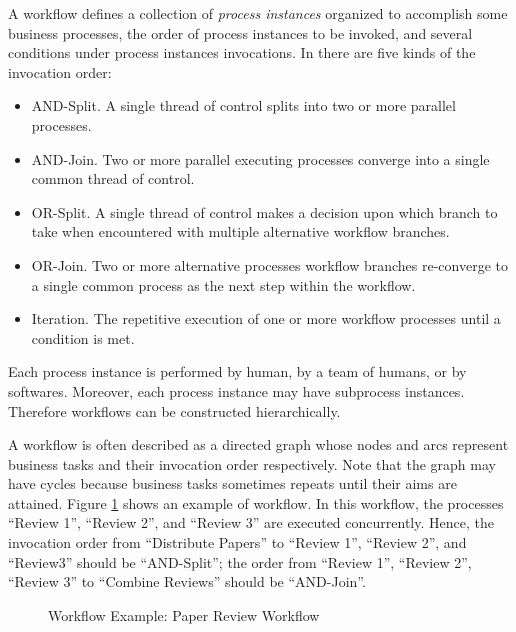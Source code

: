 A workflow defines a collection of \emph{process instances} organized to
accomplish some business processes, the order of process instances to be
invoked, and several conditions under process instances invocations.
In \cite{96:wfCoalitionTC1011} there are five kinds of the invocation
order:
\begin{itemize}
 \setlength{\itemsep}{0mm}
 \setlength{\parskip}{0mm}
 \item AND-Split.  A single thread of control splits into two or more
       parallel processes.
 \item AND-Join.  Two or more parallel executing processes converge into
       a single common thread of control.
 \item OR-Split.  A single thread of control makes a decision upon which
       branch to take when encountered with multiple alternative
       workflow branches.
 \item OR-Join.  Two or more alternative processes workflow branches
       re-converge to a single common process as the next step
       within the workflow.
 \item Iteration.  The repetitive execution of one or more workflow
       processes until a condition is met.
\end{itemize}

Each process instance is performed by human, by a team of humans, or by
softwares.  Moreover, each process instance may have subprocess
instances.  Therefore workflows can be constructed hierarchically.

A workflow is often described as a directed graph whose nodes and arcs
represent business tasks and their invocation order respectively.  Note
that the graph may have cycles because business tasks sometimes repeats
until their aims are attained.  Figure \ref{fig:wfexample} shows an
example of workflow.  In this workflow, the processes ``Review 1'',
``Review 2'', and ``Review 3'' are executed concurrently.  Hence, the
invocation order from ``Distribute Papers'' to ``Review 1'', ``Review
2'', and ``Review3'' should be ``AND-Split''; the order from ``Review
1'', ``Review 2'', ``Review 3'' to ``Combine Reviews'' should be
``AND-Join''.
\begin{figure}
\begin{center}
\end{center}
\caption{Workflow Example: Paper Review Workflow}
\label{fig:wfexample}
\end{figure}

